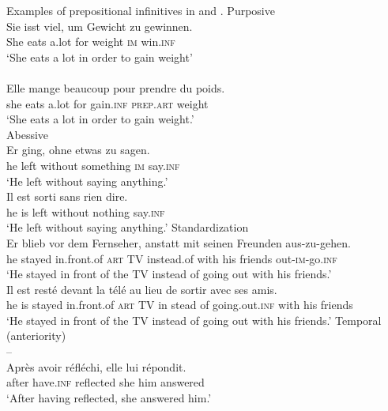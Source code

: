 \documentclass[output=paper]{langscibook}
\begin{document}
\ea Examples of prepositional infinitives in  and .\label{tab:kalm:1}
\ea {}Purposive 
\ea {}\\
   \gll Sie   isst   viel,   um   Gewicht   zu   gewinnen.\\
        She  eats  a.lot   for   weight     \textsc{im}   win.\textsc{inf}\\
   \glt ‘She eats a lot in order to gain weight’\\
\ex {}\\
    \gll Elle   mange   beaucoup pour   prendre   du   poids.\\
    she   eats   a.lot for   gain.\textsc{inf}   \textsc{prep.art}   weight \\
\glt ‘She eats a lot in order to gain weight.’\\
\z
\ex {}Abessive 
\ea {}\\
\gll Er   ging,   ohne     etwas     zu   sagen.\\
     he   left   without   something   \textsc{im}   say.\textsc{inf}\\
\glt ‘He left without saying anything.’
\ex {}\\
\gll Il   est   sorti   sans     rien     dire.\\
     he   is   left   without   nothing   say.\textsc{inf}\\
\glt ‘He left without saying anything.’
\z
\ex {}Standardization
\ea {}\\
\gll Er   blieb   vor     dem   Fernseher,   anstatt mit   seinen   Freunden   aus-zu-gehen.\\
     he   stayed   in.front.of   \textsc{art}   TV     instead.of with   his   friends   out-\textsc{im}{}-go.\textsc{inf}\\
\glt ‘He stayed in front of the TV instead of going out with his friends.’
\ex {}\\
\gll Il   est   resté   devant     la   télé au   lieu   de   sortir     avec   ses   amis.\\
     he   is   stayed   in.front.of   \textsc{art}   TV in   stead   of   going.out.\textsc{inf}    with   his   friends\\
\glt ‘He stayed in front of the TV instead of going out with his friends.’
\z
\ex Temporal (anteriority)
\ea {}\\
    –
\ex {}\\
\gll Après   avoir     réfléchi,   elle   lui   répondit.\\
after   have.\textsc{inf}   reflected   she   him   answered\\
\glt ‘After having reflected, she answered him.’\\
\z
\z
\z
\end{document}
